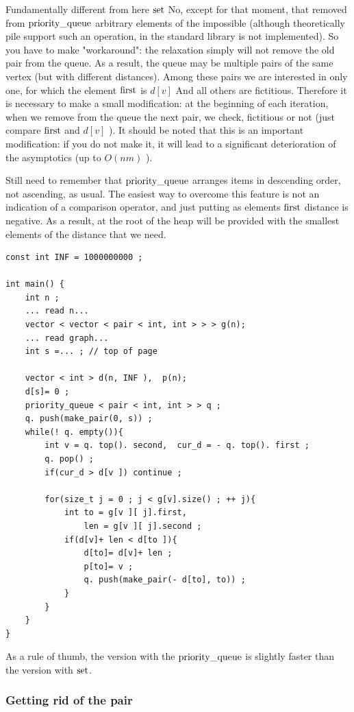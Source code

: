 Fundamentally different from here $\rm set$ No, except for that moment, that removed from $\rm priority \_queue$ arbitrary elements of the impossible (although theoretically pile support such an operation, in the standard library is not implemented). So you have to make "workaround": the relaxation simply will not remove the old pair from the queue. As a result, the queue may be multiple pairs of the same vertex (but with different distances). Among these pairs we are interested in only one, for which the element $\rm first$ is $d [v]$ And all others are fictitious. Therefore it is necessary to make a small modification: at the beginning of each iteration, when we remove from the queue the next pair, we check, fictitious or not (just compare $\rm first$ and $d [v]$ ). It should be noted that this is an important modification: if you do not make it, it will lead to a significant deterioration of the asymptotics (up to $O (nm)$ ).

Still need to remember that $\rm priority \_queue$ arranges items in descending order, not ascending, as usual. The easiest way to overcome this feature is not an indication of a comparison operator, and just putting as elements $\rm first$ distance is negative. As a result, at the root of the heap will be provided with the smallest elements of the distance that we need.

\begin{verbatim}
const int INF = 1000000000 ;
 
int main() {
    int n ;
    ... read n...
    vector < vector < pair < int, int > > > g(n);
    ... read graph...
    int s =... ; // top of page
 
    vector < int > d(n, INF ),  p(n);
    d[s]= 0 ;
    priority_queue < pair < int, int > > q ;
    q. push(make_pair(0, s)) ;
    while(! q. empty()){
        int v = q. top(). second,  cur_d = - q. top(). first ;
        q. pop() ;
        if(cur_d > d[v ]) continue ;
 
        for(size_t j = 0 ; j < g[v].size() ; ++ j){
            int to = g[v ][ j].first,
                len = g[v ][ j].second ;
            if(d[v]+ len < d[to ]){
                d[to]= d[v]+ len ;
                p[to]= v ;
                q. push(make_pair(- d[to], to)) ;
            }
        }
    }
} 
\end{verbatim}
As a rule of thumb, the version with the $\rm priority \_queue$ is slightly faster than the version with $\rm set$.

\subsubsection{ Getting rid of the pair }

